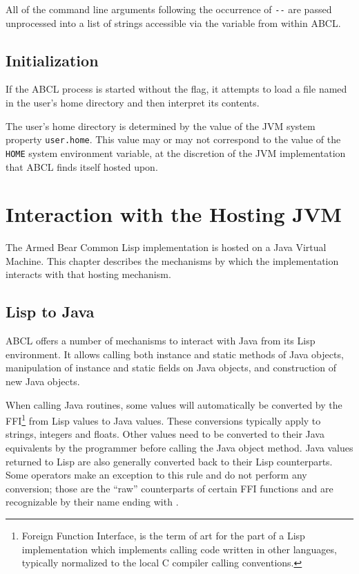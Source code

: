 \documentclass[10pt]{book}
\begin{document}
All of the command line arguments following the occurrence of \verb+--+
are passed unprocessed into a list of strings accessible via the
variable  from within ABCL.

\section{Initialization}

If the \textsc{ABCL} process is started without the 
flag, it attempts to load a file named  in the user's home
directory and then interpret its contents.

The user's home directory is determined by the value of the JVM system
property \texttt{user.home}.  This value may or may not correspond
to the value of the \texttt{HOME} system environment variable, at the
discretion of the JVM implementation that \textsc{ABCL} finds itself
hosted upon.

\chapter{Interaction with the Hosting JVM}

%

The Armed Bear Common Lisp implementation is hosted on a Java Virtual
Machine.  This chapter describes the mechanisms by which the
implementation interacts with that hosting mechanism.

\section{Lisp to Java}
\label{sec:lisp-java}

\textsc{ABCL} offers a number of mechanisms to interact with Java from its
Lisp environment. It allows calling both instance and static methods
of Java objects, manipulation of instance and static fields on Java
objects, and construction of new Java objects.

When calling Java routines, some values will automatically be
converted by the FFI\footnote{Foreign Function Interface, is the term
  of art for the part of a Lisp implementation which implements
  calling code written in other languages, typically normalized to the
  local C compiler calling conventions.}  from Lisp values to Java
values. These conversions typically apply to strings, integers and
floats. Other values need to be converted to their Java equivalents by
the programmer before calling the Java object method. Java values
returned to Lisp are also generally converted back to their Lisp
counterparts. Some operators make an exception to this rule and do not
perform any conversion; those are the ``raw'' counterparts of certain
FFI functions and are recognizable by their name ending with
.
\end{document}

